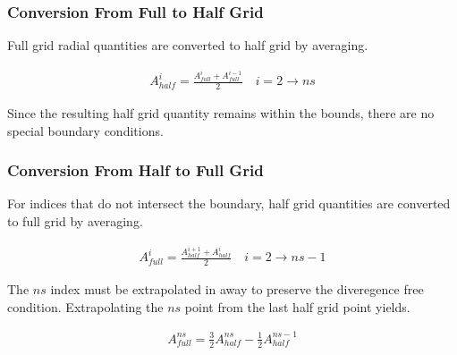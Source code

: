 \documentclass[11pt]{article}
\newcommand{\equ}[2]{
	\begin{equation}
    \begin{split}
	#1
	\label{#2}
	\end{split}
	\end{equation}
}
\begin{document}
\subsubsection{Conversion From Full to Half Grid}
Full grid radial quantities are converted to half grid by averaging.
\equ{
A^{i}_{half}=\frac{A^{i}_{full}+A^{i-1}_{full}}{2}\quad i=2\rightarrow ns
}{equ:full_to_half}
Since the resulting half grid quantity remains within the bounds, there are no special boundary conditions.

\subsubsection{Conversion From Half to Full Grid}
For indices that do not intersect the boundary, half grid quantities are converted to full grid by averaging.
\equ{
A^{i}_{full}=\frac{A^{i+1}_{half}+A^{i}_{half}}{2}\quad i=2\rightarrow ns-1
}{equ:half_to_full_middle}
The $ns$ index must be extrapolated in away to preserve the diveregence free condition.
Extrapolating the $ns$ point from the last half grid point yields.
\equ{
A^{ns}_{full}=\frac{3}{2}A^{ns}_{half}-\frac{1}{2}A^{ns-1}_{half}
}{equ:half_to_full_ns}
\end{document}
